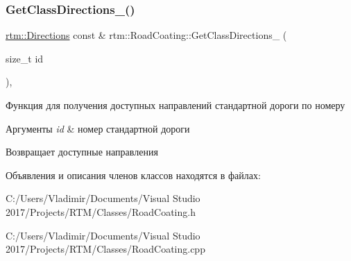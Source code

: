 \subsubsection{\texorpdfstring{Get\+Class\+Directions\+\_\+()}{GetClassDirections\_()}}
{\footnotesize\ttfamily \hyperlink{namespacertm_a4776fbfe59834ff1a16838ad6735b69a}{rtm\+::\+Directions} const  \& rtm\+::\+Road\+Coating\+::\+Get\+Class\+Directions\+\_\+ (\begin{DoxyParamCaption}\item[{size\+\_\+t}]{id }\end{DoxyParamCaption})\hspace{0.3cm}{\ttfamily [static]}, {\ttfamily [private]}}

Функция для получения доступных направлений стандартной дороги по номеру 
\begin{DoxyParams}{Аргументы}
{\em id} & номер стандартной дороги \\
\hline
\end{DoxyParams}
\begin{DoxyReturn}{Возвращает}
доступные направления 
\end{DoxyReturn}


Объявления и описания членов классов находятся в файлах\+:\begin{DoxyCompactItemize}
\item 
C\+:/\+Users/\+Vladimir/\+Documents/\+Visual Studio 2017/\+Projects/\+R\+T\+M/\+Classes/Road\+Coating.\+h\item 
C\+:/\+Users/\+Vladimir/\+Documents/\+Visual Studio 2017/\+Projects/\+R\+T\+M/\+Classes/Road\+Coating.\+cpp\end{DoxyCompactItemize}
